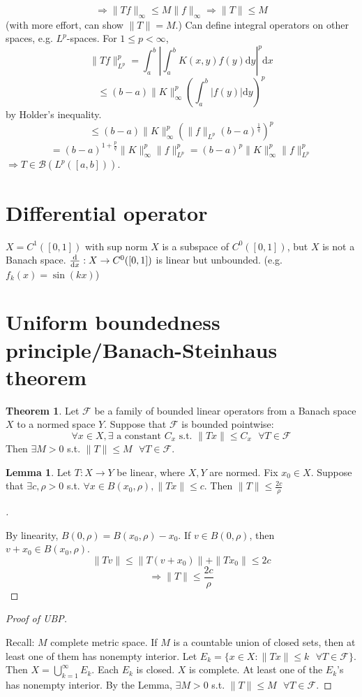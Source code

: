 \documentclass{article}
\theoremstyle{definition}
\newtheorem{thm}{Theorem}
\newtheorem{lem}{Lemma}
\newenvironment{proofs}[1][\proofname]{%
  \begin{proof}[#1]$ $\par\nobreak\ignorespaces
}{%
  \end{proof}
}
\newcommand{\sfa}{\text{  } \forall}
\begin{document}
\[
	\Rightarrow \|T f \|_\infty \leq M \|f\|_\infty \Rightarrow \|T\| \leq M
\]
(with more effort, can show $\|T\| = M$.)
Can define integral operators on other spaces, e.g. $L^p$-spaces.
For $1 \leq p < \infty$, 
\[
	\|T f\|_{L^p}^p = \int_a^b \left|\int_a^b K(x, y) f(y) \mathrm{d} y\right|^p \mathrm{d} x
\]
\[
	\leq (b- a) \|K\|_\infty^p\left(\int_a^b |f(y)| \mathrm{d} y \right)^p
\]
by Holder's inequality.
\[
	\leq (b - a) \|K\|_\infty^p \left( \|f\|_{L^p} (b - a)^{\frac{1}{q}} \right)^p
\]
\[
	= (b - a)^{1 + \frac{p}{q}} \|K\|_\infty^p \|f\|_{L^p}^p = (b - a)^p \|K\|_\infty^p \|f\|_{L^p}^p
\]
$\Rightarrow T \in \mathcal{B}(L^p([a, b]))$.

\section*{Differential operator}

$X = C^1([0, 1])$ with sup norm
$X$ is a subspace of $C^0([0, 1])$, but $X$ is not a Banach space.
$\dv{x}: X \to C^0([0, 1])$ is linear but unbounded. (e.g. $f_k(x) = \sin(kx)$)

\section*{Uniform boundedness principle/Banach-Steinhaus theorem}

\begin{thm}
	Let $\mathcal{F}$ be a family of bounded linear operators from a Banach space $X$ to a normed space $Y$.
	Suppose that $\mathcal{F}$ is bounded pointwise:
	\[
		\forall x \in X, \exists \text{ a constant } C_x \text{ s.t. }\|T x\| \leq C_x \sfa T \in \mathcal{F}
	\]
	Then $\exists M > 0$ s.t. $\|T\| \leq M \sfa T \in \mathcal{F}$.
\end{thm}

\begin{lem}
	Let $T:X \to Y$ be linear, where $X, Y$ are normed.
	Fix $x_0 \in X$. Suppose that $\exists c, \rho > 0$ s.t. $\forall x \in B(x_0, \rho), \|T x\| \leq c$.
	Then $\|T\| \leq \frac{2c}{\rho}$
\end{lem}

\begin{proofs}
	By linearity, $B(0, \rho) = B(x_0, \rho) - x_0$.
	If $v \in B(0, \rho)$, then $v + x_0 \in B(x_0, \rho)$.
	\[
		\|T v \| \leq \|T(v + x_0)\| + \|T x_0 \| \leq 2c
	\]
	\[
		\Rightarrow \|T\| \leq \frac{2c}{\rho}
	\]
\end{proofs}

\begin{proofs}[Proof of UBP]
	Recall: $M$ complete metric space.
	If $M$ is a countable union of closed sets, then at least one of them has nonempty interior.
	Let $E_k = \{x \in X: \|T x \| \leq k \sfa T \in \mathcal{F}\}$.
	Then $X = \bigcup_{k = 1}^\infty E_k$.
	Each $E_k$ is closed.
	$X$ is complete.
	At least one of the $E_k$'s has nonempty interior.
	By the Lemma, $\exists M > 0$ s.t. $\|T \| \leq M \sfa T \in \mathcal{F}$.
\end{proofs}
\end{document}
